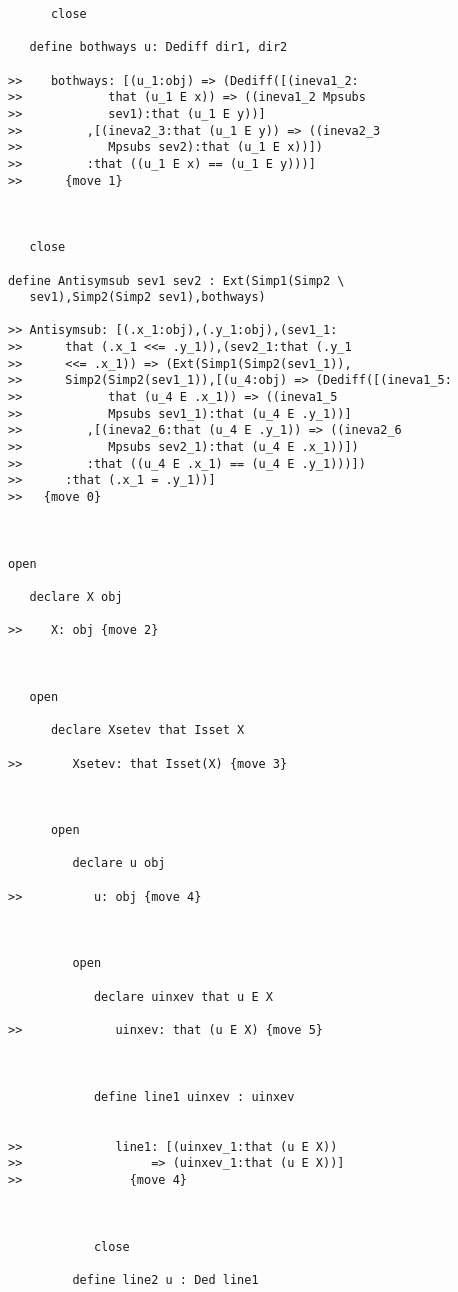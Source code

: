 \documentclass[12pt]{article}
\begin{document}
\begin{verbatim}
      close

   define bothways u: Dediff dir1, dir2

>>    bothways: [(u_1:obj) => (Dediff([(ineva1_2:
>>            that (u_1 E x)) => ((ineva1_2 Mpsubs
>>            sev1):that (u_1 E y))]
>>         ,[(ineva2_3:that (u_1 E y)) => ((ineva2_3
>>            Mpsubs sev2):that (u_1 E x))])
>>         :that ((u_1 E x) == (u_1 E y)))]
>>      {move 1}



   close

define Antisymsub sev1 sev2 : Ext(Simp1(Simp2 \
   sev1),Simp2(Simp2 sev1),bothways)

>> Antisymsub: [(.x_1:obj),(.y_1:obj),(sev1_1:
>>      that (.x_1 <<= .y_1)),(sev2_1:that (.y_1
>>      <<= .x_1)) => (Ext(Simp1(Simp2(sev1_1)),
>>      Simp2(Simp2(sev1_1)),[(u_4:obj) => (Dediff([(ineva1_5:
>>            that (u_4 E .x_1)) => ((ineva1_5
>>            Mpsubs sev1_1):that (u_4 E .y_1))]
>>         ,[(ineva2_6:that (u_4 E .y_1)) => ((ineva2_6
>>            Mpsubs sev2_1):that (u_4 E .x_1))])
>>         :that ((u_4 E .x_1) == (u_4 E .y_1)))])
>>      :that (.x_1 = .y_1))]
>>   {move 0}



open

   declare X obj

>>    X: obj {move 2}



   open

      declare Xsetev that Isset X

>>       Xsetev: that Isset(X) {move 3}



      open

         declare u obj

>>          u: obj {move 4}



         open

            declare uinxev that u E X

>>             uinxev: that (u E X) {move 5}



            define line1 uinxev : uinxev


>>             line1: [(uinxev_1:that (u E X))
>>                  => (uinxev_1:that (u E X))]
>>               {move 4}



            close

         define line2 u : Ded line1


\end{verbatim}
\end{document}
